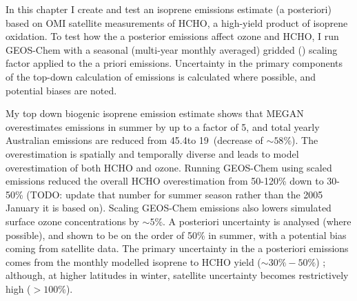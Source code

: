   In this chapter I create and test an isoprene emissions estimate (a posteriori) based on OMI satellite measurements of HCHO, a high-yield product of isoprene oxidation.
  To test how the a posterior emissions affect ozone and HCHO, I run GEOS-Chem with a seasonal (multi-year monthly averaged) gridded (\lowhr) scaling factor applied to the a priori emissions.
  Uncertainty in the primary components of the top-down calculation of emissions is calculated where possible, and potential biases are noted.
  
  My top down biogenic isoprene emission estimate shows that MEGAN overestimates emissions in summer by up to a factor of 5, and total yearly Australian emissions are reduced from 45.4\tgpyr to 19\tgpyr ~(decrease of $\sim 58\%$).
  The overestimation is spatially and temporally diverse and leads to model overestimation of both HCHO and ozone.
  Running GEOS-Chem using scaled emissions reduced the overall HCHO overestimation from 50-120\% down to 30-50\% (TODO: update that number for summer season rather than the 2005 January it is based on).
  Scaling GEOS-Chem emissions also lowers simulated surface ozone concentrations by $\sim 5\%$.
  A posteriori uncertainty is analysed (where possible), and shown to be on the order of 50\% in summer, with a potential bias coming from satellite data.
  The primary uncertainty in the a posteriori emissions comes from the monthly modelled isoprene to HCHO yield ($\sim 30\%-50\%$) ; although, at higher latitudes in winter, satellite uncertainty becomes restrictively high ($>100\%$).
  
  
  
